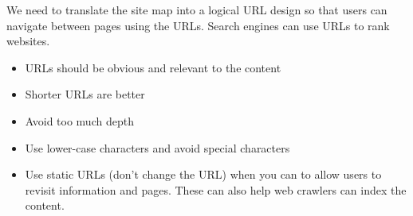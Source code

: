 We need to translate the site map into a logical URL design so that users can navigate between pages using the URLs.
Search engines can use URLs to rank websites.
\begin{itemize}
	\item URLs should be obvious and relevant to the content
	\item Shorter URLs are better
	\item Avoid too much depth
	\item Use lower-case characters and avoid special characters
	\item Use static URLs (don't change the URL) when you can to allow users to revisit information and pages.
	      These can also help web crawlers can index the content.
\end{itemize}
